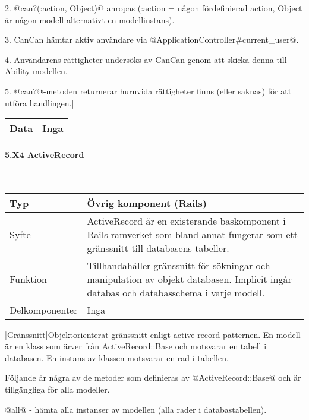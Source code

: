 \documentclass[a4paper, twoside, 11pt, titlepage]{article}
\begin{document}
			2. @can?(:action, Object)@ anropas (:action = någon fördefinierad action, Object är någon modell alternativt en modellinstans).

			3. CanCan hämtar aktiv användare via @ApplicationController\#current\_user@.

			4. Användarens rättigheter undersöks av CanCan genom att skicka denna till Ability-modellen.

			5. @can?@-metoden returnerar huruvida rättigheter finns (eller saknas) för att utföra handlingen.|

			\begin {table} [ht] \begin{tabular} {  p{3.5cm} p{9.6cm} }
				\hline
				Data & Inga  \\
				\hline
			\end{tabular} \end{table} \FloatBarrier


			\paragraph{5.X4 ActiveRecord}\

			\begin {table} [ht] \begin{tabular} {  p{3.5cm} p{9.6cm} }
				\hline
				Typ & Övrig komponent (Rails)  \\
				\hline
				Syfte & ActiveRecord är en existerande baskomponent i Rails-ramverket som bland annat fungerar som ett gränssnitt till databasens tabeller.   \\
				\hline
				Funktion & Tillhandahåller gränssnitt för sökningar och manipulation av objekt databasen. Implicit ingår databas och databasschema i varje modell.  \\
				\hline
				Delkomponenter &  Inga  \\
				\hline
			\end{tabular} \end{table} \FloatBarrier
			\vspace{6mm}

			|Gränssnitt|Objektorienterat gränssnitt enligt active-record-patternen. En modell är en klass som ärver från ActiveRecord::Base och motsvarar en tabell i databasen. En instans av klassen motsvarar en rad i tabellen.

			Följande är några av de metoder som definieras av @ActiveRecord::Base@ och är tillgängliga för alla modeller.

			@all@ - hämta alla instanser av modellen (alla rader i databastabellen).
\end{document}
